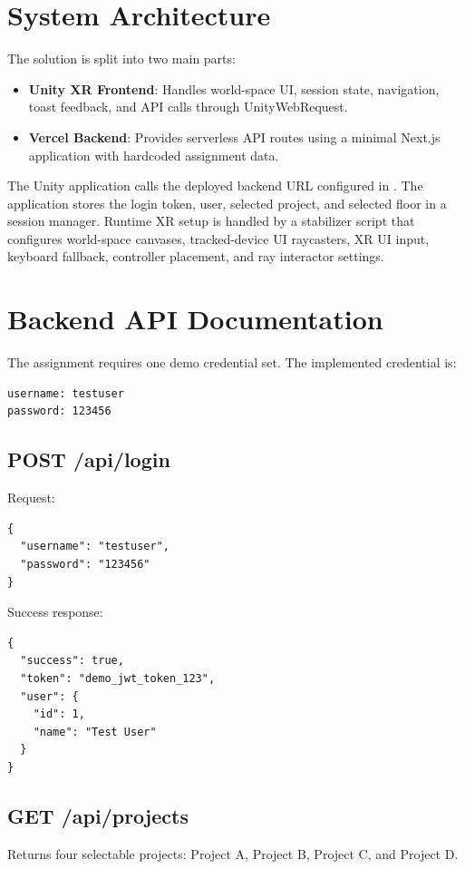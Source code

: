 \documentclass[11pt,a4paper]{article}
\begin{document}
\section{System Architecture}
The solution is split into two main parts:

\begin{itemize}
    \item \textbf{Unity XR Frontend}: Handles world-space UI, session state, navigation, toast feedback, and API calls through UnityWebRequest.
    \item \textbf{Vercel Backend}: Provides serverless API routes using a minimal Next.js application with hardcoded assignment data.
\end{itemize}

The Unity application calls the deployed backend URL configured in . The application stores the login token, user, selected project, and selected floor in a session manager. Runtime XR setup is handled by a stabilizer script that configures world-space canvases, tracked-device UI raycasters, XR UI input, keyboard fallback, controller placement, and ray interactor settings.

\section{Backend API Documentation}
The assignment requires one demo credential set. The implemented credential is:
\begin{verbatim}
username: testuser
password: 123456
\end{verbatim}

\subsection*{POST /api/login}
Request:
\begin{verbatim}
{
  "username": "testuser",
  "password": "123456"
}
\end{verbatim}

Success response:
\begin{verbatim}
{
  "success": true,
  "token": "demo_jwt_token_123",
  "user": {
    "id": 1,
    "name": "Test User"
  }
}
\end{verbatim}

\subsection*{GET /api/projects}
Returns four selectable projects: Project A, Project B, Project C, and Project D.
\end{document}
